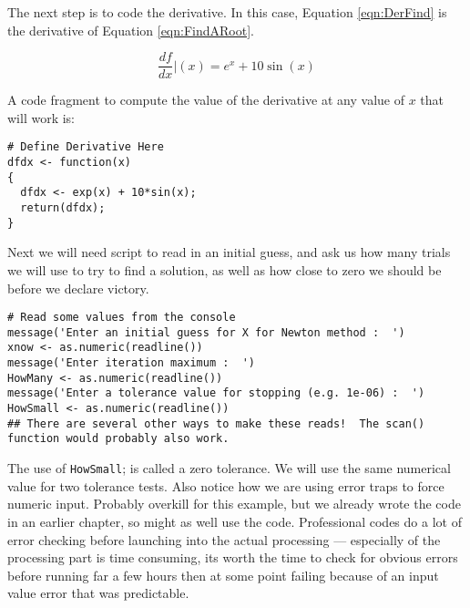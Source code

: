 
The next step is to code the derivative.   In this case, Equation \ref{eqn:DerFind} is the derivative of Equation \ref{eqn:FindARoot}.

\begin{equation}
\frac{df}{dx}\vert{(x)} = e^x + 10 \sin(x)
\label{eqn:DerFind}
\end{equation}

A code fragment to compute the value of the derivative at any value of $x$ that will work is:

\begin{lstlisting}[caption=R code fragment for the derivative calculation, label=lst:NewtonsDerivative]
# Define Derivative Here
dfdx <- function(x)
{
  dfdx <- exp(x) + 10*sin(x); 
  return(dfdx);
}
\end{lstlisting}

Next we will need script to read in an initial guess, and ask us how many trials we will use to try to find a solution, as well as how close to zero we should be before we declare victory.   
\newpage

\begin{lstlisting}[caption=R code fragment for reading input data from the programmer, label=lst:InputNewtonData]
# Read some values from the console
message('Enter an initial guess for X for Newton method :  ')
xnow <- as.numeric(readline())
message('Enter iteration maximum :  ')
HowMany <- as.numeric(readline())
message('Enter a tolerance value for stopping (e.g. 1e-06) :  ')
HowSmall <- as.numeric(readline())
## There are several other ways to make these reads!  The scan() function would probably also work.
\end{lstlisting}



The use of \texttt{HowSmall}; is called a zero tolerance.   We will use the same numerical value for two tolerance tests.   Also notice how we are using error traps to force numeric input.   Probably overkill for this example, but we already wrote the code in an earlier chapter, so might as well use the code.  Professional codes do a lot of error checking before launching into the actual processing --- especially of the processing part is time consuming, its worth the time to check for obvious errors before running far a few hours then at some point failing because of an input value error that was predictable.


